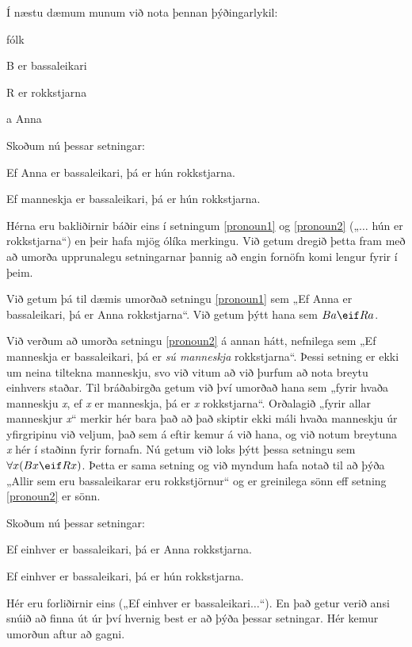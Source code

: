 Í næstu dæmum munum við nota þennan þýðingarlykil:
	\begin{ekey}
		\item[\text{yfirgrip}] fólk
		\item[B]  er bassaleikari
		\item[R]  er rokkstjarna
		\item[a] Anna
	\end{ekey}
Skoðum nú þessar setningar:
	\begin{earg}
		\item[\ex{pronoun1}] Ef Anna er bassaleikari, þá er hún rokkstjarna.
		\item[\ex{pronoun2}] Ef manneskja er bassaleikari, þá er hún rokkstjarna.
	\end{earg}
Hérna eru bakliðirnir báðir eins í setningum \ref{pronoun1} og \ref{pronoun2} („$\ldots$ hún er rokkstjarna“) en þeir hafa mjög ólíka merkingu. Við getum dregið þetta fram með að umorða upprunalegu setningarnar þannig að engin fornöfn komi lengur fyrir í þeim. 

Við getum þá til dæmis umorðað setningu \ref{pronoun1} sem „Ef Anna er bassaleikari, þá er Anna rokkstjarna“. Við getum þýtt hana sem $Ba \eif Ra$.

Við verðum að umorða setningu \ref{pronoun2} á annan hátt, nefnilega sem „Ef manneskja er bassaleikari, þá er \emph{sú manneskja} rokkstjarna“. Þessi setning er ekki um neina tiltekna manneskju, svo við vitum að við þurfum að nota breytu einhvers staðar. Til bráðabirgða getum við því umorðað hana sem „fyrir hvaða manneskju \emph{x}, ef \emph{x} er manneskja, þá er \emph{x} rokkstjarna“. Orðalagið „fyrir allar manneskjur \emph{x}“ merkir hér bara það að það skiptir ekki máli hvaða manneskju úr yfirgripinu við veljum, það sem á eftir kemur á við hana, og við notum breytuna \emph{x} hér í staðinn fyrir fornafn. Nú getum við loks þýtt þessa setningu sem $\forall x (Bx \eif Rx)$. Þetta er sama setning og við myndum hafa notað til að þýða „Allir sem eru bassaleikarar eru rokkstjörnur“ og er greinilega sönn eff setning \ref{pronoun2} er sönn.

Skoðum nú þessar setningar:

	\begin{earg}
		\item[\ex{anyone1}] Ef einhver er bassaleikari, þá er Anna rokkstjarna.
		\item[\ex{anyone2}] Ef einhver er bassaleikari, þá er hún rokkstjarna.
	\end{earg}
Hér eru forliðirnir eins („Ef einhver er bassaleikari$\ldots$“). En það getur verið ansi snúið að finna út úr því hvernig best er að þýða þessar setningar. Hér kemur umorðun aftur að gagni.

